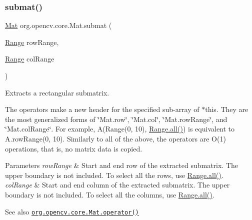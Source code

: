 \subsubsection{\texorpdfstring{submat()}{submat()}\hspace{0.1cm}{\footnotesize\ttfamily [2/3]}}
{\footnotesize\ttfamily \mbox{\hyperlink{classorg_1_1opencv_1_1core_1_1_mat}{Mat}} org.\+opencv.\+core.\+Mat.\+submat (\begin{DoxyParamCaption}\item[{\mbox{\hyperlink{classorg_1_1opencv_1_1core_1_1_range}{Range}}}]{row\+Range,  }\item[{\mbox{\hyperlink{classorg_1_1opencv_1_1core_1_1_range}{Range}}}]{col\+Range }\end{DoxyParamCaption})}

Extracts a rectangular submatrix.

The operators make a new header for the specified sub-\/array of {\ttfamily $\ast$this}. They are the most generalized forms of \char`\"{}\+Mat.\+row\char`\"{}, \char`\"{}\+Mat.\+col\char`\"{}, \char`\"{}\+Mat.\+row\+Range\char`\"{}, and \char`\"{}\+Mat.\+col\+Range\char`\"{}. For example, {\ttfamily A(Range(0, 10), \mbox{\hyperlink{classorg_1_1opencv_1_1core_1_1_range_a2dd4a07a9715665aacee5c7cdf79a175}{Range.\+all()}})} is equivalent to {\ttfamily A.\+row\+Range(0, 10)}. Similarly to all of the above, the operators are O(1) operations, that is, no matrix data is copied.


\begin{DoxyParams}{Parameters}
{\em row\+Range} & Start and end row of the extracted submatrix. The upper boundary is not included. To select all the rows, use {\ttfamily \mbox{\hyperlink{classorg_1_1opencv_1_1core_1_1_range_a2dd4a07a9715665aacee5c7cdf79a175}{Range.\+all()}}}. \\
\hline
{\em col\+Range} & Start and end column of the extracted submatrix. The upper boundary is not included. To select all the columns, use {\ttfamily \mbox{\hyperlink{classorg_1_1opencv_1_1core_1_1_range_a2dd4a07a9715665aacee5c7cdf79a175}{Range.\+all()}}}.\\
\hline
\end{DoxyParams}
\begin{DoxySeeAlso}{See also}
\href{http://docs.opencv.org/modules/core/doc/basic_structures.html#mat-operator}{\tt org.\+opencv.\+core.\+Mat.\+operator()} 
\end{DoxySeeAlso}
\mbox{\label{classorg_1_1opencv_1_1core_1_1_mat_a37b5962d59cd8a91a081e232e07979f9}} 
